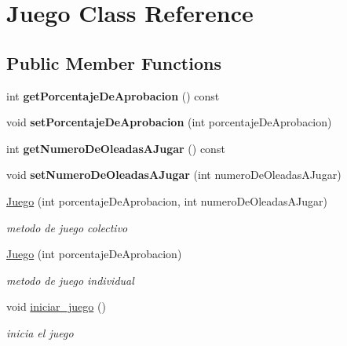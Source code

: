 \hypertarget{classJuego}{}\section{Juego Class Reference}
\label{classJuego}
\subsection*{Public Member Functions}
\begin{DoxyCompactItemize}
\item 
\mbox{\label{classJuego_afc8f4d1f6b344b3096c6ef2b2087d482}} 
int {\bfseries get\+Porcentaje\+De\+Aprobacion} () const
\item 
\mbox{\label{classJuego_ad6e8df5a83eb69689f903299d54aadbf}} 
void {\bfseries set\+Porcentaje\+De\+Aprobacion} (int porcentaje\+De\+Aprobacion)
\item 
\mbox{\label{classJuego_aa34c44ffacf1801c5baf4335fcc6fbfc}} 
int {\bfseries get\+Numero\+De\+Oleadas\+A\+Jugar} () const
\item 
\mbox{\label{classJuego_a92cbdfefb44b85f21add9694d13fdc27}} 
void {\bfseries set\+Numero\+De\+Oleadas\+A\+Jugar} (int numero\+De\+Oleadas\+A\+Jugar)
\item 
\hyperlink{classJuego_a81c4a707b89b6fc9daf1657bf49ea851}{Juego} (int porcentaje\+De\+Aprobacion, int numero\+De\+Oleadas\+A\+Jugar)
\begin{DoxyCompactList}\small\item\em metodo de juego colectivo \end{DoxyCompactList}\item 
\hyperlink{classJuego_ad55bfa8c90aff47becec97660f3b9d3d}{Juego} (int porcentaje\+De\+Aprobacion)
\begin{DoxyCompactList}\small\item\em metodo de juego individual \end{DoxyCompactList}\item 
\mbox{\label{classJuego_a1e9a8a72cc08b344cf07efcfe87f75f5}} 
void \hyperlink{classJuego_a1e9a8a72cc08b344cf07efcfe87f75f5}{iniciar\+\_\+juego} ()
\begin{DoxyCompactList}\small\item\em inicia el juego \end{DoxyCompactList}\end{DoxyCompactItemize}
